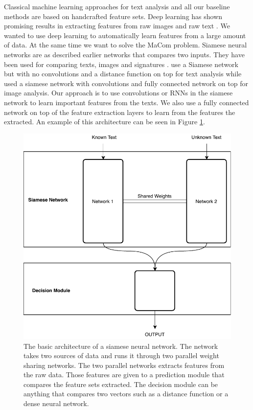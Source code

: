 Classical machine learning approaches for text analysis and all our baseline
methods are based on handcrafted feature sets. Deep learning has shown
promising results in extracting features from raw images and raw text
\citep{hongxiaosunyuan}. We wanted to use deep learning to automatically
learn features from a large amount of data. At the same time we want to solve
the MaCom problem. Siamese neural networks are as described earlier networks
that compares two inputs. They have been used for comparing texts, images and
signatures \citep{Koch2015SiameseNN,NIPS1993_769,qian:2018}. \citet{qian:2018}
use a Siamese network but with no convolutions and a distance function on top
for text analysis while \citet{Koch2015SiameseNN} used a siamese network with
convolutions and fully connected network on top for image analysis. Our approach
is to use convolutions or \gls{RNN}s in the siamese network to learn important
features from the texts. We also use a fully connected network on top of the
feature extraction layers to learn from the features the extracted. An example
of this architecture can be seen in Figure \ref{fig:siamese_example}.

\begin{figure}
    \centering
    \includegraphics[scale=0.5]{./pictures/method/siamese}
    \caption{The basic architecture of a siamese neural network. The network
        takes two sources of data and runs it through two parallel weight
        sharing networks. The two parallel networks extracts features from the
        raw data. Those features are given to a prediction module that compares
        the feature sets extracted. The decision module can be anything that
        compares two vectors such as a distance function or a dense neural
        network.}
    \label{fig:siamese_example}
\end{figure}

